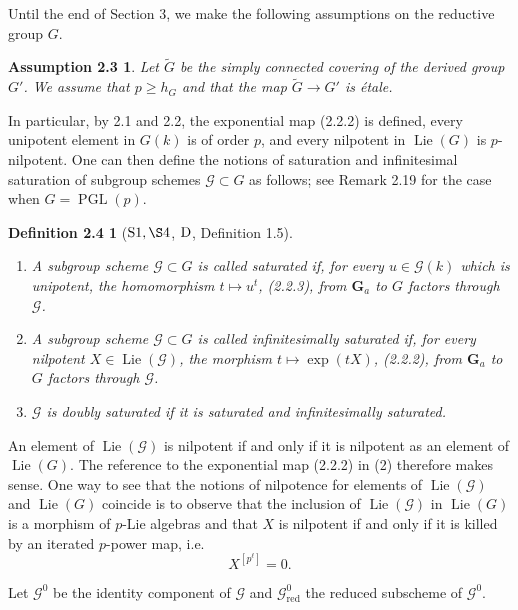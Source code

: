 \documentclass[11pt]{article}
\newtheorem*{assumption23}{Assumption 2.3}
\newtheorem*{definition24}{Definition 2.4}
\newcommand{\Ga}{\mathbf G_a}
\newcommand{\Lie}{\operatorname{Lie}}
\newcommand{\red}{\mathrm{red}}
\begin{document}
Until the end of Section 3, we make the following assumptions on the reductive group
\(G\).

\begin{assumption23}
Let \(\widetilde G\) be the simply connected covering of the derived group \(G'\).
We assume that \(p\ge h_G\) and that the map \(\widetilde G\to G'\) is étale.
\end{assumption23}

In particular, by 2.1 and 2.2, the exponential map (2.2.2) is defined, every unipotent
element in \(G(k)\) is of order \(p\), and every nilpotent in \(\Lie(G)\) is
\(p\)-nilpotent. One can then define the notions of saturation and infinitesimal
saturation of subgroup schemes \(\mathcal G\subset G\) as follows; see Remark 2.19
for the case when \(G=\operatorname{PGL}(p)\).

\begin{definition24}[\({\rm S1},\S4\), \({\rm D}\), Definition 1.5]
\begin{enumerate}[label=(\arabic*),leftmargin=2em]
\item A subgroup scheme \(\mathcal G\subset G\) is called saturated if, for every
\(u\in \mathcal G(k)\) which is unipotent, the homomorphism \(t\mapsto u^t\),
(2.2.3), from \(\Ga\) to \(G\) factors through \(\mathcal G\).
\item A subgroup scheme \(\mathcal G\subset G\) is called infinitesimally saturated if,
for every nilpotent \(X\in\Lie(\mathcal G)\), the morphism
\(t\mapsto \exp(tX)\), (2.2.2), from \(\Ga\) to \(G\) factors through
\(\mathcal G\).
\item \(\mathcal G\) is doubly saturated if it is saturated and infinitesimally
saturated.
\end{enumerate}
\end{definition24}

An element of \(\Lie(\mathcal G)\) is nilpotent if and only if it is nilpotent as an
element of \(\Lie(G)\). The reference to the exponential map (2.2.2) in (2) therefore
makes sense. One way to see that the notions of nilpotence for elements of
\(\Lie(\mathcal G)\) and \(\Lie(G)\) coincide is to observe that the inclusion of
\(\Lie(\mathcal G)\) in \(\Lie(G)\) is a morphism of \(p\)-Lie algebras and that \(X\)
is nilpotent if and only if it is killed by an iterated \(p\)-power map, i.e.
\[
  X^{[p^\ell]}=0.
\]

Let \(\mathcal G^0\) be the identity component of \(\mathcal G\) and
\(\mathcal G^0_{\red}\) the reduced subscheme of \(\mathcal G^0\).
\end{document}
